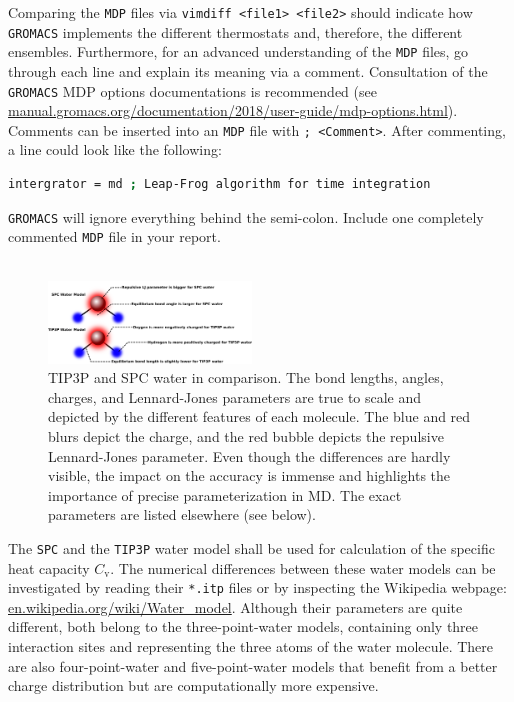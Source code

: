 \documentclass[9pt,tutorial]{livecoms}
\newcommand{\code}[1]{\colorbox{light-gray}{\texttt{#1}}}
\begin{document}
Comparing the \texttt{MDP} files via \code{vimdiff <file1> <file2>} should indicate how \texttt{GROMACS} implements the different thermostats and, therefore, the different ensembles. Furthermore, for an advanced understanding of the \texttt{MDP} files, go through each line and explain its meaning via a comment. Consultation of the \texttt{GROMACS} MDP options documentations is recommended (see \url{manual.gromacs.org/documentation/2018/user-guide/mdp-options.html}). Comments can be inserted into an \texttt{MDP} file with \code{; <Comment>}. After commenting, a line could look like the following:
\begin{lstlisting}[language=bash]
intergrator = md ; Leap-Frog algorithm for time integration
\end{lstlisting}
\texttt{GROMACS} will ignore everything behind the semi-colon. Include one completely commented \texttt{MDP} file in your report.\\ \\
\begin{figure}[H]
    \centering
    \includegraphics[width=0.48\textwidth]{figures/watermodels.png}
    \caption{TIP3P and SPC water in comparison. The bond lengths, angles, charges, and Lennard-Jones parameters are true to scale and depicted by the different features of each molecule. The blue and red blurs depict the charge, and the red bubble depicts the repulsive Lennard-Jones parameter. Even though the differences are hardly visible, the impact on the accuracy is immense and highlights the importance of precise parameterization in MD. The exact parameters are listed elsewhere (see below).}
    \label{fig:watermodels}
\end{figure}
The \texttt{SPC} and the \texttt{TIP3P} water model shall be used for calculation of the specific heat capacity $C_\text{v}$. The numerical differences between these water models can be investigated by reading their \code{*.itp} files or by inspecting the Wikipedia webpage: \url{en.wikipedia.org/wiki/Water_model}. Although their parameters are quite different, both belong to the three-point-water models, containing only three interaction sites and representing the three atoms of the water molecule. There are also four-point-water and five-point-water models that benefit from a better charge distribution but are computationally more expensive.\\
\end{document}
